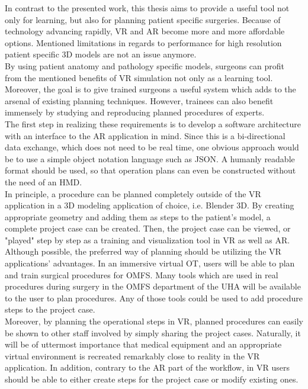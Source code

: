 In contrast to the presented work, this thesis aims to provide a useful tool not only for learning, but also for planning patient specific surgeries.
Because of technology advancing rapidly, VR and AR become more and more affordable options.
Mentioned limitations in regards to performance for high resolution patient specific 3D models are not an issue anymore.
\\ By using patient anatomy and pathology specific models, surgeons can profit from the mentioned benefits of VR simulation not only as a learning tool.
Moreover, the goal is to give trained surgeons a useful system which adds to the arsenal of existing planning techniques.
However, trainees can also benefit immensely by studying and reproducing planned procedures of experts.
\\ The first step in realizing these requirements is to develop a software architecture with an interface to the AR application in mind.
Since this is a bi-directional data exchange, which does not need to be real time, one obvious approach would be to use a simple object notation language such as JSON.
A humanly readable format should be used, so that operation plans can even be constructed without the need of an HMD.
\\ In principle, a procedure can be planned completely outside of the VR application in a 3D modeling application of choice, i.e. Blender 3D.
By creating appropriate geometry and adding them as steps to the patient's model, a complete project case can be created.
Then, the project case can be viewed, or "played" step by step as a training and visualization tool in VR as well as AR.
\\ Although possible, the preferred way of planning should be utilizing the VR applications' advantages.
In an immersive virtual OT, users will be able to plan and train surgical procedures for OMFS.
Many tools which are used in real procedures during surgery in the OMFS department of the UHA will be available to the user to plan procedures.
Any of those tools could be used to add procedure steps to the project case.
\\ Moreover, by planning the operational steps in VR, planned procedures can easily be shown to other staff involved by simply sharing the project cases.
Naturally, it will be of uttermost importance that medical equipment and an appropriate virtual environment is recreated remarkably close to reality in the VR application.
In addition, contrary to the AR part of the workflow, in VR users should be able to either create steps for the project case or modify existing ones.